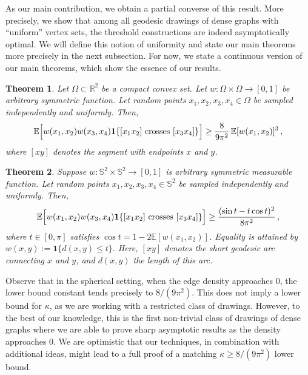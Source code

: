 \documentclass[reqno, 11pt]{amsart}
\newtheorem{theorem}{Theorem}
\theoremstyle{definition}
\newcommand{\II}[1]{\mathbf{1}{#1}}
\begin{document}
As our main contribution, we obtain a partial converse of this result. More precisely, we show that among all geodesic drawings of dense graphs with ``uniform'' vertex sets, the threshold constructions are indeed asymptotically optimal. We will define this notion of uniformity and state our main theorems more precisely in the next subsection. For now, we state a continuous version of our main theorems, which show the essence of our results. 

\begin{theorem}\label{thm:intro-planar-main}
    Let $\Omega \subset {\mathbb R}^2$ be a compact convex set.  Let $w : \Omega \times \Omega \to [0,1]$ be arbitrary symmetric function. Let random points $x_1, x_2, x_3, x_4 \in \Omega$ be sampled independently and uniformly. Then, 
       \begin{equation*}
    {\mathbb E}\Bigl[{w(x_1,x_2)w(x_3,x_4)\II{\{[x_1x_2]\text{ crosses }[x_3x_4]\}}\Bigr]} \geq  \frac{8}{9\pi^2} \,  {\mathbb E}[w(x_1,x_2)]^3\,,
    \end{equation*} 
    where $[xy]$ denotes the segment with endpoints $x$ and $y$.
\end{theorem} 


\begin{theorem}\label{thm:intro-spherical-main}
    Suppose $w : {\mathbb S}^2 \times {\mathbb S}^2 \to [0,1]$ is arbitrary symmetric measurable function. Let random points $x_1, x_2, x_3, x_4 \in {\mathbb S}^2$ be sampled independently and uniformly. Then, 
    \begin{equation*}
    {\mathbb E}\Bigl[{w(x_1,x_2)w(x_3,x_4)\II{\{[x_1x_2]\text{ crosses }[x_3x_4]\}}\Bigr]} \geq  \frac{(\sin t-t\cos t)^2}{8\pi^2}\,,
    \end{equation*}
where \(t\in[0,\pi]\) satisfies $\cos t = 1-2 {\mathbb E}[w(x_1,x_2)]$. Equality is attained by \( w(x,y):=\II{\{d(x,y)\le t\}}.\) Here, $[xy]$ denotes the short geodesic arc connecting $x$ and $y$, and $d(x,y)$ the length of this arc.
\end{theorem} 


Observe that in the spherical setting, when the edge density approaches $0$, the lower bound constant tends precisely to $8/(9\pi^2)$. This does not imply a lower bound for $\kappa$, as we are working with a restricted class of drawings. However, to the best of our knowledge, this is the first non-trivial class of drawings of dense graphs where we are able to prove sharp asymptotic results as the density approaches 0. We are optimistic that our techniques, in combination with additional ideas, might lead to a full proof of a matching $\kappa\geq{8}/{(9\pi^2)}$ lower bound.
\end{document}
